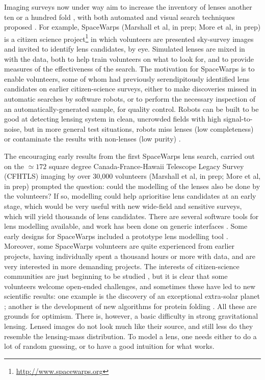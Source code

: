 \documentclass[usenatbib]{mn2e}
\newcommand{\sw}{SpaceWarps\xspace}
\begin{document}
Imaging surveys now under way aim to increase the inventory of lenses
another ten or a hundred fold \citep[see
e.g.][]{Marshall2005,OguriMarshall2010}, with both automated and
visual search techniques proposed
\citep[e.g.][]{Marshall2009,More2012ApJ,Gavazzi2014}. For example, \sw
(Marshall et al, in prep; More et al, in prep) is a citizen science
project\footnote{\url{http://www.spacewarps.org}} in which volunteers
are presented sky-survey images and invited to identify lens
candidates, by eye.  Simulated lenses are mixed in with the data,
both to help train volunteers on what to look for, and to provide
measures of the effectiveness of the search.  The motivation for \sw
is to enable volunteers, some of whom had previously serendipitously
identified lens candidates on earlier citizen-science surveys,
either to make discoveries missed in automatic searches by
software robots, or to perform the necessary inspection of an
automatically-generated sample, for quality control.  Robots can be
built to be good at detecting lensing system in clean, uncrowded fields
with high signal-to-noise, but in more general test situations, robots
miss lenses (low completeness) or contaminate the results with
non-lenses (low purity) \citep{Marshall2009}.

The encouraging early results from the first \sw lens search, carried
out on the $\simeq172$ square degree Canada-France-Hawaii Telescope
Legacy Survey (CFHTLS) imaging by over 30,000 volunteers (Marshall et
al, in prep; More et al, in prep) prompted the question: could the
modelling of the lenses also be done by the volunteers?  If so,
modelling could help aprioritise lens candidates at an early stage,
which would be very useful with new wide-field and sensitive surveys,
which will yield thousands of lens candidates.  There are several
software tools for lens modelling available, and work has been done on
generic interfaces \citep[e.g.][]{2014A&C.....5...28L}.  Some early
designs for \sw included a prototype lens modelling tool
\citep{2010AAS...21543527N}. Moreover, some \sw volunteers are quite
experienced from earlier projects, having individually spent a
thousand hours or more with data, and are very interested in more
demanding projects.  The interests of citizen-science communities are
just beginning to be studied \citep[e.g.,][]{2013AEdRv..12a0106J}, but
it is clear that some volunteers welcome open-ended challenges, and
sometimes these have led to new scientific results: one example is the
discovery of an exceptional extra-solar planet
\citep{2013ApJ...768..127S}; another is the development of new
algorithms for protein folding \citep{Khatib22112011}.  All these are
grounds for optimism.  There is, however, a basic difficulty in strong
gravitational lensing. Lensed images do not look much like their
source, and still less do they resemble the lensing-mass distribution.
To model a lens, one needs either to do a lot of random guessing, or
to have a good intuition for what works.
\end{document}
